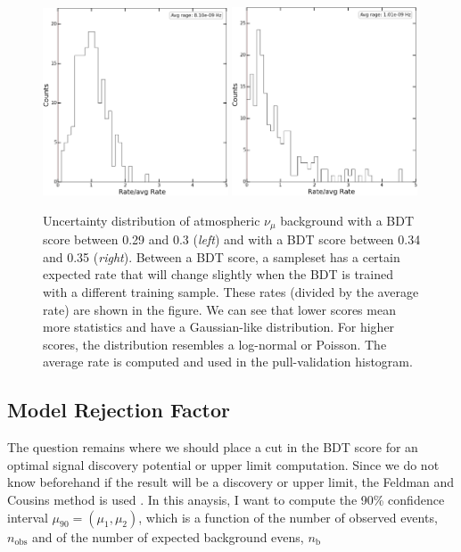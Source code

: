 \begin{figure}
\centering
\includegraphics[width=0.49\textwidth]{chapter8/img/PMF_test_numu_atmos_bg_betweenbin_0p29_0p3_crop.png}
\includegraphics[width=0.49\textwidth]{chapter8/img/PMF_test_numu_atmos_bg_betweenbin_0p34_0p35_crop.png}
\caption{Uncertainty distribution of atmospheric $\nu_\mu$ background with a BDT score between 0.29 and 0.3 (\textit{left}) and with a BDT score between 0.34 and 0.35 (\textit{right}). Between a BDT score, a sampleset has a certain expected rate that will change slightly when the BDT is trained with a different training sample. These rates (divided by the average rate) are shown in the figure. We can see that lower scores mean more statistics and have a Gaussian-like distribution. For higher scores, the distribution resembles a log-normal or Poisson. The average rate is computed and used in the pull-validation histogram.}
\label{fig:betweenbins}
\end{figure}


\subsection{Model Rejection Factor}
\label{subsec:mrf}
The question remains where we should place a cut in the BDT score for an optimal signal discovery potential or upper limit computation. Since we do not know beforehand if the result will be a discovery or upper limit, the Feldman and Cousins method is used \cite{Feldman:1997qc}. In this anaysis, I want to compute the 90\% confidence interval $\mu_{90} = (\mu_1, \mu_2)$, which is a function of the number of observed events, $n_\textrm{obs}$ and of the number of expected background evens, $n_\textrm{b}$

